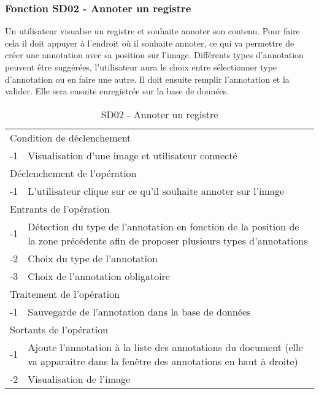 \documentclass[a4paper]{article}
\begin{document}
\subsubsection{Fonction SD02 - Annoter un registre}

Un utilisateur visualise un registre et souhaite annoter son contenu. Pour faire cela il doit appuyer à l’endroit où il souhaite annoter, ce qui va permettre de créer une annotation avec sa position sur l’image. Différents types d’annotation peuvent être suggérées, l’utilisateur aura le choix entre sélectionner type d’annotation ou en faire une autre. Il doit ensuite remplir l’annotation et la valider. Elle sera ensuite enregistrée sur la base de données.\\

\begin{table}[H]
  \centering
   \small
	\begin{tabular}{|c|p{12cm}|}
   		\hline
   			\rowcolor{lightgray}\multicolumn{2}{|c|}{\textbf{SD02 - Annoter un registre}} \\
   		\hline
   			\multicolumn{2}{|l|}{Condition de d\'eclenchement} \\
   		\hline
   			-1 & Visualisation d’une image et utilisateur connecté\\
   		\hline
   			\multicolumn{2}{|l|}{D\'eclenchement de l'op\'eration} \\
   		\hline
   			-1 & L’utilisateur clique sur ce qu’il souhaite annoter sur l’image\\
   		\hline
   			\multicolumn{2}{|l|}{Entrants de l'op\'eration} \\
   		\hline
   			-1 & Détection du type de l’annotation en fonction de la position de la zone précédente afin de proposer plusieurs types d’annotations\\
            -2 & Choix du type de l’annotation \\
			-3 & Choix de l’annotation obligatoire \\
   		\hline
   			\multicolumn{2}{|l|}{Traitement de l'op\'eration} \\
  		\hline
   			-1 & Sauvegarde de l’annotation dans la base de données\\
   		\hline
   			\multicolumn{2}{|l|}{Sortants de l'op\'eration} \\
   		\hline
   			-1 & Ajoute l’annotation à la liste des annotations du document (elle va apparaitre dans la fenêtre des annotations en haut à droite)\\
			-2 & Visualisation de l’image\\
   		\hline
	\end{tabular}
  \caption{SD02 - Annoter un registre}
  \normalsize
  \label{tab:annoter_registre}
\end{table}
\end{document}
